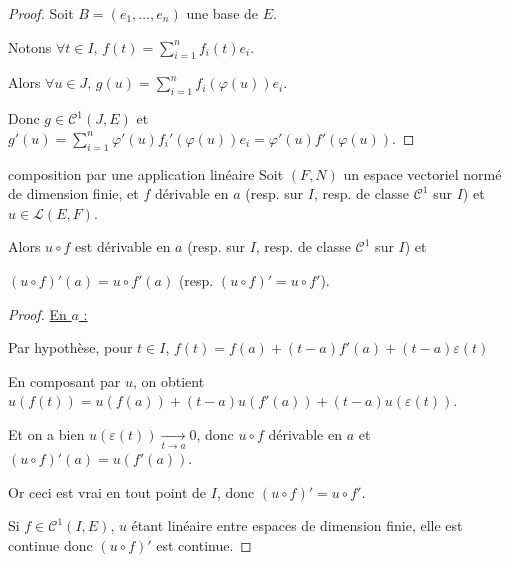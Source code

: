 
\begin{proof}
    Soit $B = (e_1, \ldots, e_n)$ une base de $E$. 

    Notons $\displaystyle \forall t \in I, \, f(t) = \sum_{i=1}^n f_i(t)e_i$. 

    Alors $\displaystyle \forall u \in J, \, g(u ) = \sum_{i=1}^n f_i(\varphi(u))e_i$. 

    Donc $g \in \mathscr C^1(J, E)$ et $\displaystyle g'(u) = \sum_{i=1}^n \varphi'(u)f_i'(\varphi(u))e_i = \varphi'(u)f'(\varphi(u))$.
\end{proof}

\begin{theoreme}{composition par une application linéaire}{}
    Soit $(F, N)$ un espace vectoriel normé de dimension finie, et $f$ dérivable en $a$
    (resp. sur $I$, resp. de classe $\mathscr C^1$ sur $I$) et $u \in \mathscr{L }(E, F)$.

    Alors $u \circ f$ est dérivable en $a$ (resp. sur $I$, resp. de classe $\mathscr C^1$ sur $I$) et
    
    $(u \circ f)'(a) = u \circ f'(a) $ (resp. $(u \circ f)' = u \circ f'$).

\end{theoreme}


\begin{proof}
    \uline{En $a$ :}

    Par hypothèse, pour $t \in I$, $f(t) = f(a) + (t-a)f'(a) + (t-a)\varepsilon(t)$

    En composant par $u$, on obtient $u(f(t)) = u(f(a)) + (t-a)u(f'(a)) + (t-a)u(\varepsilon(t))$.

    Et on a bien $u(\varepsilon(t)) \xrightarrow[t \to a]{} 0$, donc $u \circ f$ dérivable en $a$ et $(u \circ f)'(a) = u(f'(a))$.

    Or ceci est vrai en tout point de $I$, donc $(u \circ f)' = u \circ f'$.

    Si $f \in \mathscr C^1(I, E)$, $u$ étant linéaire entre espaces de dimension finie, elle est continue donc $(u \circ f)'$ 
    est continue. 
\end{proof}

